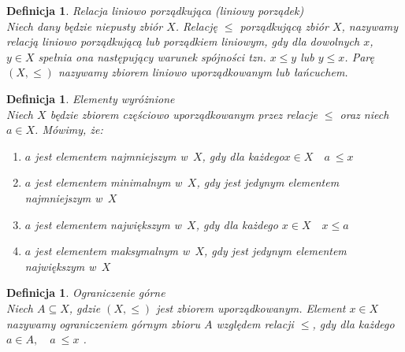 \documentclass[12pt,a4paper]{report}
\newtheorem{definition}[theorem]{Definicja}
\begin{document}
\begin{definition}{Relacja liniowo porządkująca (liniowy porządek) \cite[Rozdział 2]{blaszczyk2007}}\label{def-porzadek-liniowy}\\
Niech dany będzie niepusty zbiór $X$. Relację $\leq$ porządkującą zbiór $X$, nazywamy relacją liniowo porządkującą lub porządkiem liniowym, gdy dla dowolnych $x$, $y \in X$ spełnia ona następujący warunek spójności tzn. $x \leq y$ lub $y \leq x$. Parę $(X, \leq)$ nazywamy zbiorem liniowo uporządkowanym lub łańcuchem.
\end{definition}


\begin{definition}{Elementy wyróżnione \cite[Rozdział 2]{blaszczyk2007}}\\
Niech $X$ będzie zbiorem częściowo uporządkowanym przez relacje $\leq$ oraz niech $a \in X$. Mówimy, że:
\begin{enumerate}
\item $a$ jest elementem najmniejszym w~$X$, gdy dla każdego$x \in X \quad a~\leq x$
\item $a$ jest elementem minimalnym w~$X$, gdy jest jedynym elementem najmniejszym w~$X$
\item $a$ jest elementem największym w~$X$, gdy dla każdego $ x \in X \quad x\leq a$
\item $a$ jest elementem maksymalnym w~$X$, gdy jest jedynym elementem największym w~$X$
\end{enumerate}

\end{definition}


\begin{definition}{Ograniczenie górne \cite[Rozdział 2]{blaszczyk2007}}\\
Niech $A \subseteq X$, gdzie $(X, \leq)$ jest zbiorem uporządkowanym. Element $x \in X$ nazywamy ograniczeniem górnym zbioru $A$ względem relacji $\leq$, gdy dla każdego $a \in A, \quad a~\leq x$ . 
\end{definition}
\end{document}

